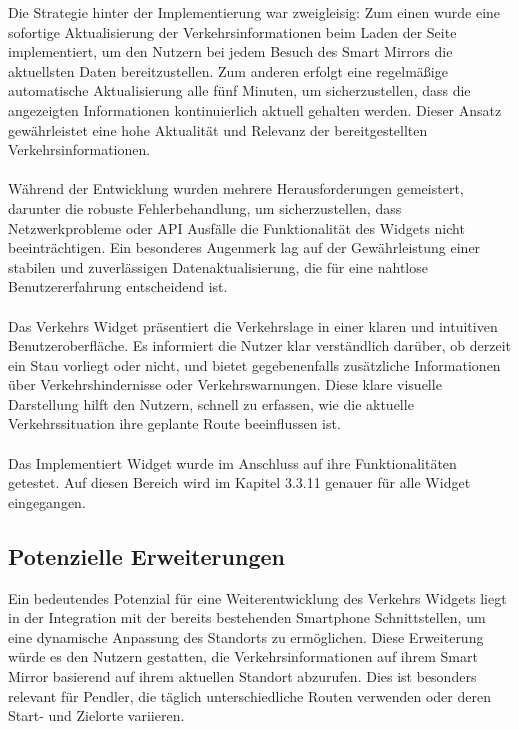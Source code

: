 \noindent
Die Strategie hinter der Implementierung war zweigleisig: Zum einen wurde eine sofortige Aktualisierung der Verkehrsinformationen beim Laden der Seite implementiert, um den Nutzern bei jedem Besuch des Smart Mirrors die aktuellsten Daten bereitzustellen. Zum anderen erfolgt eine regelmäßige automatische Aktualisierung alle fünf Minuten, um sicherzustellen, dass die angezeigten Informationen kontinuierlich aktuell gehalten werden. Dieser Ansatz gewährleistet eine hohe Aktualität und Relevanz der bereitgestellten Verkehrsinformationen. \\ \\
\noindent
Während der Entwicklung wurden mehrere Herausforderungen gemeistert, darunter die robuste Fehlerbehandlung, um sicherzustellen, dass Netzwerkprobleme oder API Ausfälle die Funktionalität des Widgets nicht beeinträchtigen. Ein besonderes Augenmerk lag auf der Gewährleistung einer stabilen und zuverlässigen Datenaktualisierung, die für eine nahtlose Benutzererfahrung entscheidend ist. \\ \\
\noindent
Das Verkehrs Widget präsentiert die Verkehrslage in einer klaren und intuitiven Benutzeroberfläche. Es informiert die Nutzer klar verständlich darüber, ob derzeit ein Stau vorliegt oder nicht, und bietet gegebenenfalls zusätzliche Informationen über Verkehrshindernisse oder Verkehrswarnungen. Diese klare visuelle Darstellung hilft den Nutzern, schnell zu erfassen, wie die aktuelle Verkehrssituation ihre geplante Route beeinflussen ist. \\ \\
\noindent
Das Implementiert Widget wurde im Anschluss auf ihre Funktionalitäten getestet. Auf diesen Bereich wird im Kapitel 3.3.11 genauer für alle Widget eingegangen.

\subsection*{Potenzielle Erweiterungen}
Ein bedeutendes Potenzial für eine Weiterentwicklung des Verkehrs Widgets liegt in der Integration mit der bereits bestehenden Smartphone Schnittstellen, um eine dynamische Anpassung des Standorts zu ermöglichen. Diese Erweiterung würde es den Nutzern gestatten, die Verkehrsinformationen auf ihrem Smart Mirror basierend auf ihrem aktuellen Standort abzurufen. Dies ist besonders relevant für Pendler, die täglich unterschiedliche Routen verwenden oder deren Start- und Zielorte variieren.



